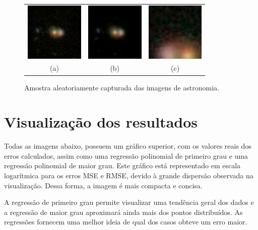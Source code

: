 \begin{figure}[H]
    \centering
    \caption{Amostra aleatoriamente capturada das imagens de astronomia.}
    \begin{tabular}{c c c}
        \includegraphics[width=2.8cm]{fig/samples/astronomy/astronomy_original.png} & \includegraphics[width=2.8cm]{fig/samples/astronomy/astronomy_non_specific_training.png} & \includegraphics[width=2.8cm]{fig/samples/astronomy/astronomy_specific_training.png} \\
        (a) & (b) & (c)
    \end{tabular}
    \label{fig:img-results:fig2}
\end{figure}

\section{Visualização dos resultados}
\label{sec:visualizacao-resultado}

Todas as imagens abaixo, possuem um gráfico superior, com os valores reais dos erros calculados, assim como uma regressão polinomial de primeiro grau e uma regressão polinomial de maior grau. Este gráfico está representado em escala logarítmica para os erros MSE e RMSE, devido à grande dispersão observada na visualização. Dessa forma, a imagem é mais compacta e concisa. 


A regressão de primeiro grau permite visualizar uma tendência geral dos dados e a regressão de maior grau aproximará ainda mais dos pontos distribuídos. As regressões fornecem uma melhor ideia de qual dos casos obteve um erro maior.

